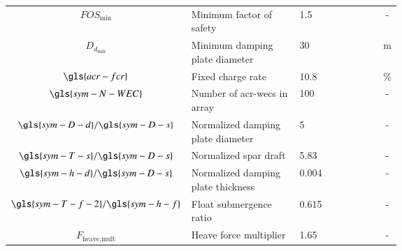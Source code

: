 \begin{table}[ht]
{\begin{tabular}{cP{0.35\linewidth}P{0.3\linewidth}c}
$FOS_{\text{min}}$ & Minimum factor of safety& 1.5 & -  \\ 
$D_{d_{\text{min}}}$ & Minimum damping plate diameter & 30 & m  \\ 
$\gls{acr-fcr}$ & Fixed charge rate& 10.8 & \%  \\ 
$\gls{sym-N-WEC}$ & Number of \glspl{acr-wec} in array& 100 & -  \\ 
$\gls{sym-D-d}/{\gls{sym-D-s}}$ & Normalized damping plate diameter & 5 & -  \\ 
$\gls{sym-T-s}/{\gls{sym-D-s}}$ & Normalized spar draft& 5.83 & -  \\ 
$\gls{sym-h-d}/{\gls{sym-D-s}}$ & Normalized damping plate thickness & 0.004 & -  \\ 
$\gls{sym-T-f-2}/{\gls{sym-h-f}}$ & Float submergence ratio & 0.615 & -  \\ 
$F_{\text{heave},\text{mult}}$ & Heave force multiplier & 1.65 & - \\ 
\end{tabular}
}
 \end{table}
\clearpage
